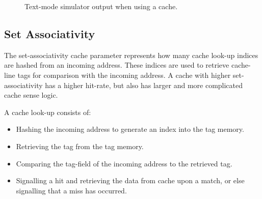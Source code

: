 \begin{figure}[h!]
\begin{center}
\caption[Text-mode simulator with a cache]{Text-mode simulator output when using
a cache.}
\label{Mem_With_Cache}
\end{center}
\end{figure}


\subsection{Set Associativity}
\label{CACHE_Associativity}
The set-associativity cache parameter represents how many cache look-up indices
are hashed from an incoming address. These indices are used to retrieve
cache-line tags for comparison with the incoming address. A cache with higher
set-associativity has a higher hit-rate, but also has larger and more complicated
cache sense logic.

A cache look-up consists of:
\begin{itemize}
  \item Hashing the incoming address to generate an index into the tag memory.
  \item Retrieving the tag from the tag memory.
  \item Comparing the tag-field of the incoming address to the retrieved tag.
  \item Signalling a hit and retrieving the data from cache upon a match, or
  else signalling that a miss has occurred.
\end{itemize}

